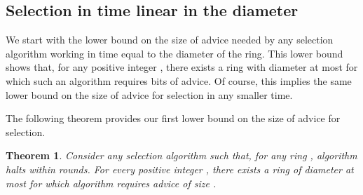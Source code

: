 \documentclass[11pt]{article}
\newtheorem{theorem}{Theorem}[section]
\begin{document}
\subsection{Selection in time linear in the diameter}

We start with the lower bound on the size of advice needed by any selection algorithm working in time equal to the diameter of the ring.
This lower bound shows that, for any positive integer , there exists a ring with diameter at most  for which such an algorithm requires 
 bits of advice. Of course, this implies the same lower bound on the size of advice for selection in any smaller time.


The following theorem provides our first lower bound on the size of advice for selection. 

\begin{theorem}\label{lb1}
Consider any selection algorithm  such that, for any ring , algorithm  halts within  rounds. For every positive integer , there exists a ring  of diameter at most  for which algorithm  requires advice of size .
\end{theorem}
\end{document}
